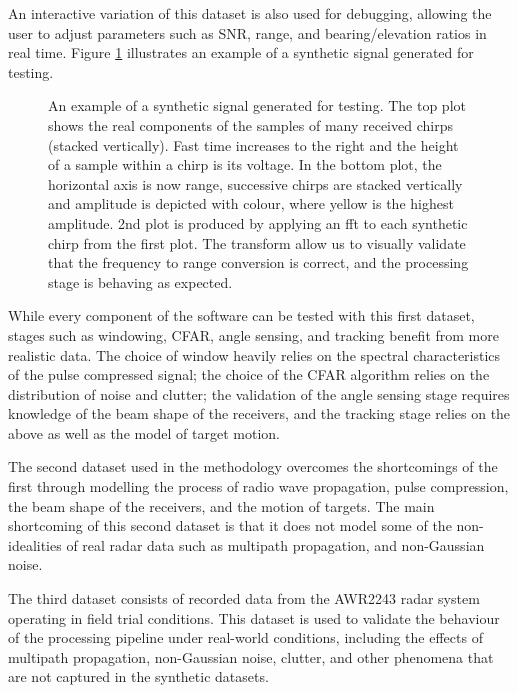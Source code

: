 An interactive variation of this dataset is 
also used for debugging, allowing the user to adjust parameters such as SNR, range, and bearing/elevation
ratios in real time. Figure \ref{fig:synthetic-signal} illustrates an example of a synthetic signal generated 
for testing.

\begin{figure}
    \caption[Example of a synthetic signal generated for testing.]{An 
    example of a synthetic signal generated for testing. The top plot shows the real components of the 
    samples of many received chirps (stacked vertically). Fast time increases to the right and the height 
    of a sample within a chirp is its voltage. In the bottom plot, the horizontal axis is now range, 
    successive chirps are stacked vertically and amplitude is depicted with colour, where yellow is the highest 
    amplitude. 2nd plot is produced by applying an \gls{fft} to each synthetic chirp from the first plot. 
    The transform allow us to visually validate that the frequency to range conversion is correct, 
    and the processing stage is behaving as expected.}
    \label{fig:synthetic-signal}
\end{figure}

While every component of the software can be tested with this first dataset, stages such as windowing, CFAR, angle sensing, and tracking benefit from more 
realistic data. The choice of window heavily relies
on the spectral characteristics of the pulse compressed signal; the choice of the CFAR algorithm
relies on the distribution of noise and clutter; the validation of the angle sensing stage requires
knowledge of the beam shape of the receivers, and the tracking stage relies on the above as well
as the model of target motion. 

The second dataset used in the methodology overcomes the shortcomings of the first through modelling
the process of radio wave propagation, pulse compression, the beam shape of the receivers, and the
motion of targets. The main shortcoming of this second dataset is that it does not model some of 
the non-idealities of real radar data such as multipath propagation, and non-Gaussian noise.

The third dataset consists of recorded data from the AWR2243 radar system operating in field 
trial conditions. This dataset is used to validate the behaviour of the processing pipeline 
under real-world conditions, including the effects of multipath propagation, non-Gaussian noise, 
clutter, and other phenomena that are not captured in the synthetic datasets. 

